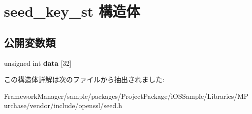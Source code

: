 \hypertarget{structseed__key__st}{}\section{seed\+\_\+key\+\_\+st 構造体}
\label{structseed__key__st}
\subsection*{公開変数類}
\begin{DoxyCompactItemize}
\item 
\hypertarget{structseed__key__st_ab9f1ccfde6c6664bd92ce73b7d3c1556}{}unsigned int {\bfseries data} \mbox{[}32\mbox{]}\label{structseed__key__st_ab9f1ccfde6c6664bd92ce73b7d3c1556}

\end{DoxyCompactItemize}


この構造体詳解は次のファイルから抽出されました\+:\begin{DoxyCompactItemize}
\item 
Framework\+Manager/sample/packages/\+Project\+Package/i\+O\+S\+Sample/\+Libraries/\+M\+Purchase/vendor/include/openssl/seed.\+h\end{DoxyCompactItemize}
